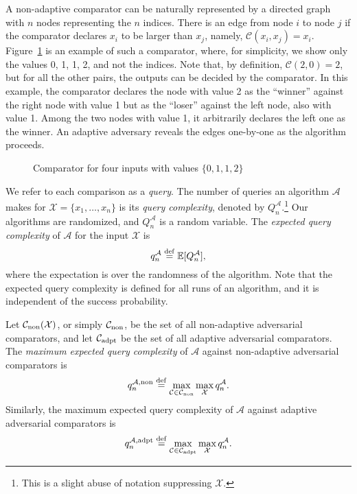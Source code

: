 \documentclass[twoside,11pt]{article}
\newcommand{\df}[1][\rm{def}]{\stackrel{#1}{=}}
\def \sets#1{{\{#1\}}}
\newcommand{\cC}{\mathcal{C}}
\newcommand{\cA}{\mathcal{A}}
\newcommand{\cX}{\mathcal{X}}
\newcommand{\EE}{\mathbb{E}}
\newcommand{\nonadaptivecomp}{\cC_{\textnormal{non}}}
\newcommand{\adaptivecomp}{\cC_{\textnormal{adpt}}}
\newcommand{\adaptive}{\textnormal{adpt}}
\newcommand{\nonadaptive}{\textnormal{non}}
\begin{document}
  A non-adaptive comparator can be naturally represented by a
  directed graph with $n$ nodes representing the $n$ indices. There is
  an edge from node $i$ to node $j$ if the comparator declares $x_i$
  to be larger than $x_j$, namely, $\cC(x_i,x_j)=x_i$.
  Figure~\ref{fig:comparison_4} is an example of such a
  comparator, where, for simplicity, we show only the values 0, 1, 1, 2,
  and not the indices.  Note that, by definition, $\cC(2,0)=2$, but for
  all the other pairs, the outputs can be decided by the comparator. In
this example, the comparator declares the node with value 2 as the
``winner'' against the right node with value 1 but as the ``loser''
against the left node, also with value 1. Among the two nodes
  with value 1, it arbitrarily declares the left one as the winner.
An adaptive adversary reveals the edges one-by-one as the algorithm
proceeds.
\begin{figure}
\begin{center}
\end{center}
\caption{Comparator for four inputs with values $\sets{0,1,1,2}$}
\label{fig:comparison_4}
\end{figure}


We refer to each comparison as a \emph{query}.  The number of queries
an algorithm $\cA$ makes for $\cX=\{x_1,\ldots, x_n\}$ is its
\emph{query complexity}, denoted by $Q_n^{\cA}$.\footnote{This
      is a slight abuse of notation suppressing $\cX$.} Our algorithms
  are randomized, and $Q_n^{\cA}$ is a random variable. The
  \emph{expected query complexity} of $\cA$ for the input $\cX$ is
\[
q_n^{\cA} \df \EE[Q_n^{\cA}],
\]
where the expectation is over the randomness of the algorithm. Note
that the expected query complexity is defined for all runs of an algorithm,
 and it is independent of the success probability.

Let $\nonadaptivecomp(\cX)$, or simply $\nonadaptivecomp$,  be the
set of all
non-adaptive adversarial comparators, and let $\adaptivecomp$ be
the set of all adaptive adversarial comparators.
The \emph{maximum expected query complexity} of $\cA$
against non-adaptive adversarial comparators is  
\begin{align}
\label{eqn:nonadaptivemodel}
 q_n^{\cA,\nonadaptive}\df\max_{\cC\in\nonadaptivecomp}\max_{\cX} q_n^{\cA}.
\end{align}
Similarly, the maximum expected
query complexity of $\cA$ against adaptive adversarial comparators is
\begin{align*}
 q_n^{\cA,\adaptive}\df\max_{\cC\in\adaptivecomp}\max_{\cX} q_n^{\cA}.
\end{align*}
\end{document}
